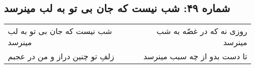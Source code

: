 \begin{center}
\section*{شماره ۴۹: شب نیست که جان بی تو به لب مینرسد}
\label{sec:049}
\begin{longtable}{l p{0.5cm} r}
شب نیست که جان بی تو به لب مینرسد
&&
روزی نه که در غصّه به شب مینرسد
\\
زلفِ تو چنین دراز و من در عجبم
&&
تا دست بدو از چه سبب مینرسد
\\
\end{longtable}
\end{center}
